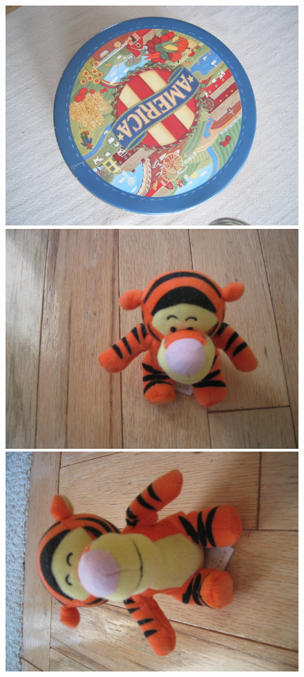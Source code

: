 \documentclass[10pt,conference,a4paper]{IEEEtran}
\begin{document}
\begin{figure}
{				\includegraphics[scale=0.091]{ukbench00006.jpg}
				\includegraphics[scale=0.091]{ukbench03810.jpg}
				\includegraphics[scale=0.091]{ukbench03811.jpg}
}
\end{figure}
\end{document}

